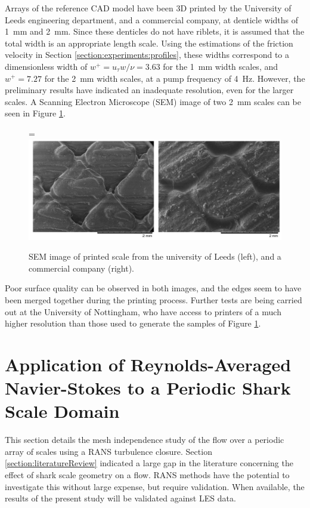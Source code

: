 \documentclass[12pt,oneside,a4paper]{article}
\newcommand*{\vcenteredhbox}[1]{\begingroup
\setbox0=\hbox{#1}\parbox{\wd0}{\box0}\endgroup}
\begin{document}
Arrays of the reference CAD model have been 3D printed by the University of Leeds engineering department, and a commercial company, at denticle widths of \SI{1}{mm} and \SI{2}{mm}. Since these denticles do not have riblets, it is assumed that the total width is an appropriate length scale. Using the estimations of the friction velocity in Section \ref{section:experiments:profiles}, these widths correspond to a dimensionless width of $w^+ = u_\tau w /\nu = 3.63$ for the \SI{1}{mm} width scales, and $w^+ = 7.27$ for the \SI{2}{mm} width scales, at a pump frequency of \SI{4}{Hz}. However, the preliminary results have indicated an inadequate resolution, even for the larger scales. A Scanning Electron Microscope (SEM) image of two \SI{2}{mm} scales can be seen in Figure \ref{figure:cad:printedSEM}. 
%
\begin{figure}
\centering
\vcenteredhbox{\includegraphics[width=\linewidth]{images/cad/printedSamples.png}}
\caption{SEM image of printed scale from the university of Leeds (left), and a commercial company (right).}
\label{figure:cad:printedSEM}
\end{figure}
%
Poor surface quality can be observed in both images, and the edges seem to have been merged together during the printing process. Further tests are being carried out at the University of Nottingham, who have access to printers of a much higher resolution than those used to generate the samples of Figure \ref{figure:cad:printedSEM}.

\newpage

\section{Application of Reynolds-Averaged Navier-Stokes to a Periodic Shark Scale Domain}
\label{section:rans}
This section details the mesh independence study of the flow over a periodic array of scales using a RANS turbulence closure. Section \ref{section:literatureReview} indicated a large gap in the literature concerning the effect of shark scale geometry on a flow. RANS methods have the potential to investigate this without large expense, but require validation. When available, the results of the present study will be validated against LES data.
\end{document}
